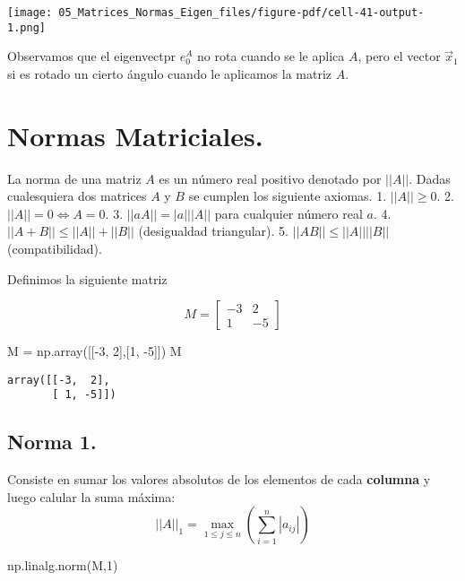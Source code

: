 \documentclass[
  letterpaper,
  DIV=11,
  numbers=noendperiod]{scrreprt}
\newenvironment{Shaded}{\begin{snugshade}}{\end{snugshade}}
\newcommand{\DecValTok}[1]{\textcolor[rgb]{0.68,0.00,0.00}{#1}}
\newcommand{\NormalTok}[1]{\textcolor[rgb]{0.00,0.23,0.31}{#1}}
\newcommand{\OperatorTok}[1]{\textcolor[rgb]{0.37,0.37,0.37}{#1}}
\begin{document}
\texttt{[image: 05\_Matrices\_Normas\_Eigen\_files/figure-pdf/cell-41-output-1.png]}

Observamos que el eigenvectpr \(e_0^A\) no rota cuando se le aplica
\(A\), pero el vector \(\vec{x}_1\) si es rotado un cierto ángulo cuando
le aplicamos la matriz \(A\).

\section{Normas Matriciales.}\label{normas-matriciales.}

La norma de una matriz \(A\) es un número real positivo denotado por
\(||A||\). Dadas cualesquiera dos matrices \(A\) y \(B\) se cumplen los
siguiente axiomas. 1. \(||A|| \ge 0\). 2. \(||A|| = 0 \iff A = 0\). 3.
\(||aA|| = |a| ||A||\) para cualquier número real \(a\). 4.
\(||A+B|| \le ||A|| + ||B||\) (desigualdad triangular). 5.
\(||AB|| \le ||A||||B||\) (compatibilidad).

Definimos la siguiente matriz

\[
M =
\begin{bmatrix}
-3 & 2 \\
1 & -5
\end{bmatrix}
\]

\begin{Shaded}
\begin{Highlighting}[]
\NormalTok{M }\OperatorTok{=}\NormalTok{ np.array([[}\OperatorTok{{-}}\DecValTok{3}\NormalTok{, }\DecValTok{2}\NormalTok{],[}\DecValTok{1}\NormalTok{, }\OperatorTok{{-}}\DecValTok{5}\NormalTok{]])}
\NormalTok{M}
\end{Highlighting}
\end{Shaded}

\begin{verbatim}
array([[-3,  2],
       [ 1, -5]])
\end{verbatim}

\subsection{Norma 1.}\label{norma-1.}

Consiste en sumar los valores absolutos de los elementos de cada
\textbf{columna} y luego calular la suma máxima: \[
||A||_1 = \max_{1 \le j \le n} \left( \sum_{i=1}^n  |a_{ij}| \right)
\]

\begin{Shaded}
\begin{Highlighting}[]
\NormalTok{np.linalg.norm(M,}\DecValTok{1}\NormalTok{)}
\end{Highlighting}
\end{Shaded}
\end{document}
